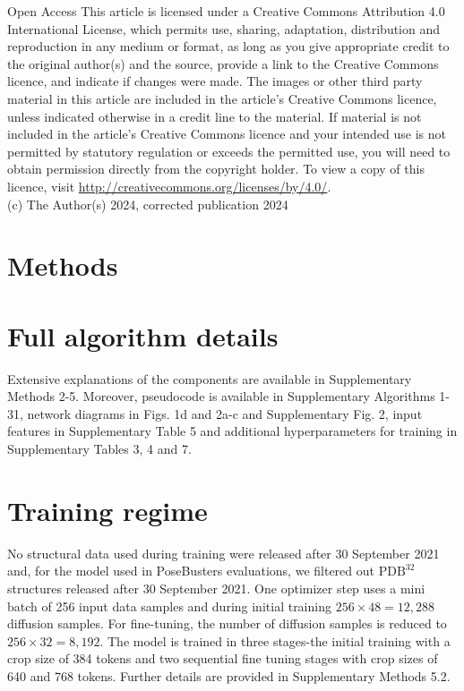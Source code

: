 \documentclass[10pt]{article}
\begin{document}
Open Access This article is licensed under a Creative Commons Attribution 4.0 International License, which permits use, sharing, adaptation, distribution and reproduction in any medium or format, as long as you give appropriate credit to the original author(s) and the source, provide a link to the Creative Commons licence, and indicate if changes were made. The images or other third party material in this article are included in the article's Creative Commons licence, unless indicated otherwise in a credit line to the material. If material is not included in the article's Creative Commons licence and your intended use is not permitted by statutory regulation or exceeds the permitted use, you will need to obtain permission directly from the copyright holder. To view a copy of this licence, visit \href{http://creativecommons.org/licenses/by/4.0/}{http://creativecommons.org/licenses/by/4.0/}.\\
(c) The Author(s) 2024, corrected publication 2024

\section*{Methods}
\section*{Full algorithm details}
Extensive explanations of the components are available in Supplementary Methods 2-5. Moreover, pseudocode is available in Supplementary Algorithms 1-31, network diagrams in Figs. 1d and 2a-c and Supplementary Fig. 2, input features in Supplementary Table 5 and additional hyperparameters for training in Supplementary Tables 3, 4 and 7.

\section*{Training regime}
No structural data used during training were released after 30 September 2021 and, for the model used in PoseBusters evaluations, we filtered out $\mathrm{PDB}^{32}$ structures released after 30 September 2021. One optimizer step uses a mini batch of 256 input data samples and during initial training $256 \times 48=12,288$ diffusion samples. For fine-tuning, the number of diffusion samples is reduced to $256 \times 32=8,192$. The model is trained in three stages-the initial training with a crop size of 384 tokens and two sequential fine tuning stages with crop sizes of 640 and 768 tokens. Further details are provided in Supplementary Methods 5.2.
\end{document}
